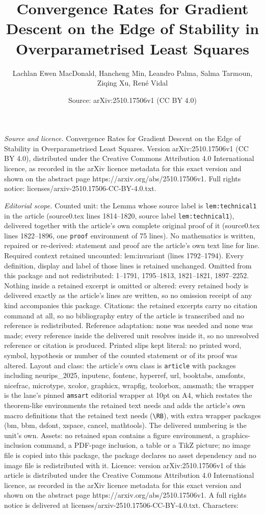 \documentclass[10pt,a4paper]{amsart}
\title[Convergence Rates for Gradient Descent on the Edge of Stabil]{Convergence Rates for Gradient Descent on the Edge of Stability in Overparametrised Least Squares}
\author{Lachlan Ewen MacDonald, Hancheng Min, Leandro Palma, Salma Tarmoun, Ziqing Xu, Ren\'e Vidal}
\date{Source: arXiv:2510.17506v1 (CC BY 4.0)}
\begin{document}
\maketitle

\noindent\emph{Source and licence.} Convergence Rates for Gradient Descent on the Edge of Stability in Overparametrised Least Squares. Version arXiv:2510.17506v1 (CC BY 4.0), distributed under the Creative Commons Attribution 4.0 International licence, as recorded in the arXiv licence metadata for this exact version and shown on the abstract page https://arxiv.org/abs/2510.17506v1. Full rights notice: licenses/arxiv-2510.17506-CC-BY-4.0.txt.\par\smallskip

\noindent\textit{Editorial scope.} Counted unit: the Lemma whose source label is \texttt{lem:technical1} in the article (source0.tex lines 1814--1820, source label \texttt{lem:technical1}), delivered together with the article's own complete original proof of it (source0.tex lines 1822--1896, one \texttt{proof} environment of 75 lines). No mathematics is written, repaired or re-derived: statement and proof are the article's own text line for line. Required context retained uncounted: lem:invariant (lines 1792--1794). Every definition, display and label of those lines is retained unchanged. Omitted from this package and not redistributed: 1--1791, 1795--1813, 1821--1821, 1897--2252. Nothing inside a retained excerpt is omitted or altered: every retained body is delivered exactly as the article's lines are written, so no omission receipt of any kind accompanies this package. Citations: the retained excerpts carry no citation command at all, so no bibliography entry of the article is transcribed and no reference is redistributed. Reference adaptation: none was needed and none was made; every reference inside the delivered unit resolves inside it, so no unresolved reference or citation is produced. Printed slips kept literal: no printed word, symbol, hypothesis or number of the counted statement or of its proof was altered. Layout and class: the article's own class is \texttt{article} with packages including neurips\_2025, inputenc, fontenc, hyperref, url, booktabs, amsfonts, nicefrac, microtype, xcolor, graphicx, wrapfig, tcolorbox, amsmath; the wrapper is the lane's pinned \texttt{amsart} editorial wrapper at 10pt on A4, which restates the theorem-like environments the retained text needs and adds the article's own macro definitions that the retained text needs (\texttt{\textbackslash RB}), with extra wrapper packages (bm, bbm, dsfont, xspace, cancel, mathtools). The delivered numbering is the unit's own. Assets: no retained span contains a figure environment, a graphics-inclusion command, a PDF-page inclusion, a table or a TikZ picture; no image file is copied into this package, the package declares no asset dependency and no image file is redistributed with it. Licence: version arXiv:2510.17506v1 of this article is distributed under the Creative Commons Attribution 4.0 International licence, as recorded in the arXiv licence metadata for this exact version and shown on the abstract page https://arxiv.org/abs/2510.17506v1. A full rights notice is delivered at licenses/arxiv-2510.17506-CC-BY-4.0.txt. Characters: 
\end{document}
